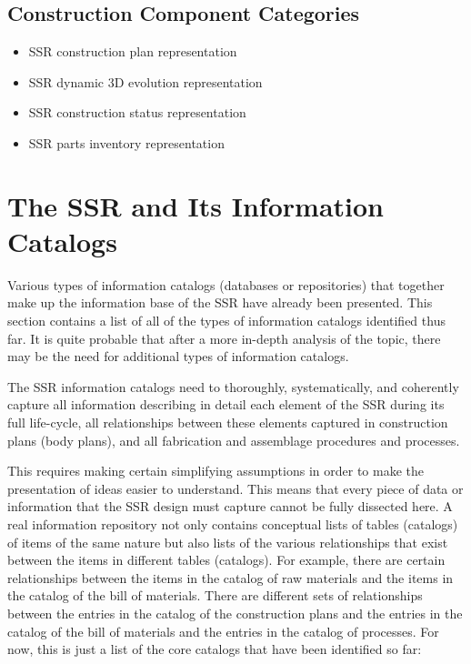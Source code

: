 \subsection{Construction Component Categories}
\begin{itemize}
\item SSR construction plan representation
\item SSR dynamic 3D evolution representation
\item SSR construction status representation
\item SSR parts inventory representation
\end{itemize}

\section{The SSR and Its Information Catalogs}

Various types of information catalogs (databases
or repositories) that together make up the information base of the SSR have already been presented.
This section contains a list of all of the types of information catalogs
identified thus far. It is quite probable that after a more in-depth analysis of the topic, there may be the need for additional types of information catalogs.

The SSR information catalogs need to thoroughly, systematically, and coherently capture 
all information describing in detail each element of the SSR during its
full life-cycle, all relationships between these elements captured in
construction plans (body plans), and all fabrication and assemblage
procedures and processes.

This requires making certain simplifying assumptions in order to make the presentation of ideas easier to understand. This means that every piece of data or information that the SSR design must capture cannot be fully dissected here.
A real information repository not only contains
conceptual lists of tables (catalogs) of items of the same nature but
also lists of the various relationships that exist between the
items in different tables (catalogs).  For example, there are certain
relationships between the items in the catalog of raw materials and the
items in the catalog of the bill of materials. There are
different sets of relationships between the entries in the catalog of
the construction plans and the entries in the catalog of the bill of
materials and the entries in the catalog of processes.  For now, this
is just a list of the core catalogs that have been identified so far:

